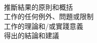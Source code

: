 \begin{flushleft}
{\large {}}\\
\end{flushleft}

推斷結果的原則和概括\\

工作的任何例外、問題或限制\\

工作的理論和/或實踐意義\\

得出的結論和建議\\